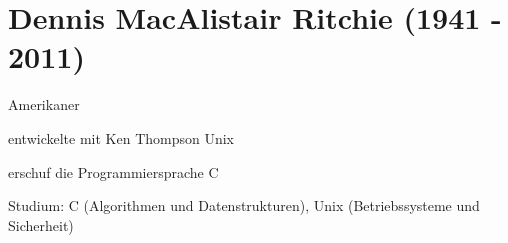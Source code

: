 \documentclass[a4paper,12pt]{report}
\begin{document}
\section*{Dennis MacAlistair Ritchie (1941 - 2011)}
\begin{itemize*}
    \item Amerikaner
    \item entwickelte mit Ken Thompson Unix
    \item erschuf die Programmiersprache C
    \item Studium: C (Algorithmen und Datenstrukturen), Unix (Betriebssysteme und Sicherheit)
\end{itemize*}





\end{document}
